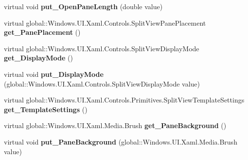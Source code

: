 \begin{DoxyCompactItemize}
\item 
\mbox{\label{class_windows_1_1_u_i_1_1_xaml_1_1_controls_1_1_split_view_a5fbb9c9badd343958b2257ca2eb5a0f2}} 
virtual void {\bfseries put\+\_\+\+Open\+Pane\+Length} (double value)
\item 
\mbox{\label{class_windows_1_1_u_i_1_1_xaml_1_1_controls_1_1_split_view_ae136f8940aa8871c0d28d1eb593a4a29}} 
virtual global\+::\+Windows.\+U\+I.\+Xaml.\+Controls.\+Split\+View\+Pane\+Placement {\bfseries get\+\_\+\+Pane\+Placement} ()
\item 
\mbox{\label{class_windows_1_1_u_i_1_1_xaml_1_1_controls_1_1_split_view_af29bc8fd9090a72aea2eaf4b3f2c0a30}} 
virtual global\+::\+Windows.\+U\+I.\+Xaml.\+Controls.\+Split\+View\+Display\+Mode {\bfseries get\+\_\+\+Display\+Mode} ()
\item 
\mbox{\label{class_windows_1_1_u_i_1_1_xaml_1_1_controls_1_1_split_view_a1b48b7569672c2b406106e1b2c94556b}} 
virtual void {\bfseries put\+\_\+\+Display\+Mode} (global\+::\+Windows.\+U\+I.\+Xaml.\+Controls.\+Split\+View\+Display\+Mode value)
\item 
\mbox{\label{class_windows_1_1_u_i_1_1_xaml_1_1_controls_1_1_split_view_add67530a837afbb62bb137f7cc503647}} 
virtual global\+::\+Windows.\+U\+I.\+Xaml.\+Controls.\+Primitives.\+Split\+View\+Template\+Settings {\bfseries get\+\_\+\+Template\+Settings} ()
\item 
\mbox{\label{class_windows_1_1_u_i_1_1_xaml_1_1_controls_1_1_split_view_a47635cfeb856accea21323a3ca5eb9da}} 
virtual global\+::\+Windows.\+U\+I.\+Xaml.\+Media.\+Brush {\bfseries get\+\_\+\+Pane\+Background} ()
\item 
\mbox{\label{class_windows_1_1_u_i_1_1_xaml_1_1_controls_1_1_split_view_a6096724a8ab2470ff7286a1cb40cb0f3}} 
virtual void {\bfseries put\+\_\+\+Pane\+Background} (global\+::\+Windows.\+U\+I.\+Xaml.\+Media.\+Brush value)

\end{DoxyCompactItemize}
